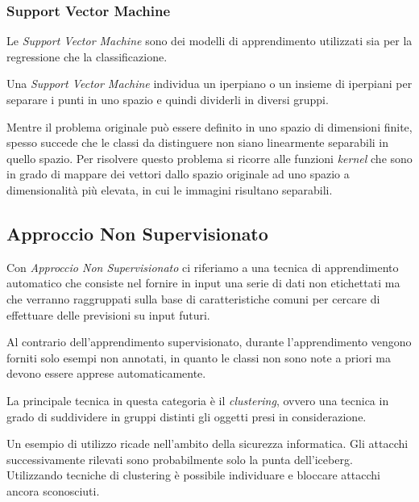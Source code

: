 \documentclass[a4paper,12pt]{report}
\begin{document}
\subsubsection{Support Vector Machine}
Le \textit{Support Vector Machine} sono dei modelli di apprendimento utilizzati sia per la regressione che la classificazione.

Una \textit{Support Vector Machine} individua un iperpiano o un insieme di iperpiani per separare i punti in uno spazio e quindi dividerli in diversi gruppi.

Mentre il problema originale può essere definito in uno spazio di dimensioni finite, spesso succede che le classi da distinguere non siano linearmente separabili in quello spazio. Per risolvere questo problema si ricorre alle funzioni \textit{kernel} che sono in grado di mappare dei vettori dallo spazio originale ad uno spazio a dimensionalità più elevata, in cui le immagini risultano separabili.


\subsection*{Approccio Non Supervisionato}
Con \textit{Approccio Non Supervisionato} \cite{unsupervised_learning} ci riferiamo a una tecnica di apprendimento automatico che consiste nel fornire in input una serie di dati non etichettati ma che verranno raggruppati sulla base di caratteristiche comuni  per cercare di effettuare delle previsioni su input futuri.


Al contrario dell'apprendimento supervisionato, durante l'apprendimento vengono forniti solo esempi non annotati, in quanto le classi non sono note a priori ma devono essere apprese automaticamente.

\bigskip

La principale tecnica in questa categoria è il \textit{clustering}, ovvero una tecnica in grado di suddividere in gruppi distinti  gli oggetti presi in considerazione.

Un esempio di utilizzo ricade nell'ambito della sicurezza informatica. Gli attacchi successivamente rilevati sono probabilmente solo la punta dell'iceberg. Utilizzando tecniche di clustering è possibile individuare e bloccare attacchi ancora sconosciuti.
\end{document}
